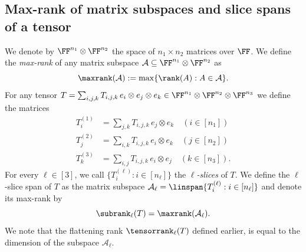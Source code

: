 \subsection{Max-rank of matrix subspaces and slice spans of a tensor}\label{subsec:maxrank}

%
    We denote by $\FF^{n_1} \otimes \FF^{n_2}$ the space of $n_1 \times n_2$ matrices over $\FF$.
    We define the \emph{max-rank} of any matrix subspace $\mathcal{A} \subseteq \FF^{n_1} \otimes \FF^{n_2}$ as
    \[
\maxrank(\mathcal{A}):=\max\{\rank(A):A\in\mathcal{A}\}.
    \]
%
%
For any tensor $T = \sum_{i,j,k} T_{i,j,k}\, e_i \otimes e_j \otimes e_k \in \FF^{n_1} \otimes \FF^{n_2} \otimes \FF^{n_3}$ we define the matrices %
%
%
%
%
%
%
\begin{align*}
T^{(1)}_i &= \sum_{j,k} T_{i,j,k}\, e_j \otimes e_k \quad (i \in [n_1])\\
T^{(2)}_j &= \sum_{i,k} T_{i,j,k}\, e_i \otimes e_k \quad (j \in [n_2])\\
T^{(3)}_k &= \sum_{i,j} T_{i,j,k}\, e_i \otimes e_j \quad (k \in [n_3]).
\end{align*}
For every $\ell \in [3]$, we call $\{T^{(\ell)}_i : i \in [n_\ell] \}$ the \emph{$\ell$-slices} of $T$. %
%
%
%
%
%
%
%
%
%
%
%
%
%
%
%
%
%
%
%
%
%
%
%
%
%
%
%
%
%
%
%
%
%
%
%
%
%
%
%
%
%
%
We define the $\ell$-slice span of $T$ as the matrix subspace
$\mathcal{A}_\ell = \linspan \{T^{(\ell)}_i : i \in [n_\ell] \}$
and denote its max-rank by
\[
\subrank_\ell(T) = \maxrank(\mathcal{A}_\ell).
\]
%
%
We note that the flattening rank $\tensorrank_\ell(T)$ defined earlier, is equal to the dimension of the subspace $\mathcal{A}_\ell$. 
